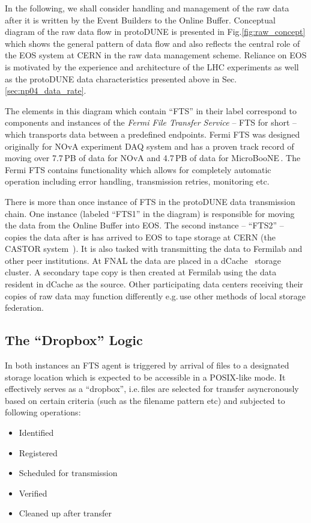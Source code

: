 \documentclass[a4paper]{jpconf}
\newcommand{\pd}{protoDUNE\xspace}
\begin{document}
In the following, we shall consider handling and management of the raw data after it is
written by the Event Builders to the Online Buffer.  Conceptual diagram of the raw data
flow in \pd is presented in Fig.\ref{fig:raw_concept} which shows the general pattern of data flow
and also reflects the central role of the EOS system at CERN \cite{eos} in the raw data management scheme.
Reliance on EOS is motivated by the experience and architecture of the LHC experiments
as well as the \pd data characteristics presented above in Sec.\,\ref{sec:np04_data_rate}.

The elements in this diagram which contain ``FTS'' in their label correspond to components and
instances of the \textit{Fermi File Transfer Service} -- FTS for short \cite{fts} -- which transports
data between a predefined endpoints. Fermi FTS was designed originally for NOvA experiment
\cite{nova} DAQ system and has a proven track record of moving over 7.7\,PB of data for NOvA
and 4.7\,PB of data for MicroBooNE\,\cite{uboone}.
The Fermi FTS contains functionality which allows for completely automatic operation
including error handling, transmission retries, monitoring etc.

There is more than once instance of FTS in the \pd data transmission chain. One instance (labeled ``FTS1''
in the diagram) is responsible for moving the data from the Online Buffer into EOS. The second instance
-- ``FTS2'' --  copies the data after is has arrived to EOS to tape storage at CERN (the CASTOR
system~\cite{castor}). It is also tasked with transmitting the data to Fermilab  and other peer
institutions. At FNAL the data are placed in a dCache~\cite{dcache} storage cluster. A secondary
tape copy is then created at Fermilab using the data resident in dCache as the source.
Other participating data centers receiving their copies of raw data may function differently
e.g.\,use other methods of local storage federation.

\subsection{The ``Dropbox'' Logic}
In both instances an FTS agent is triggered by arrival of files to a designated
storage location which is expected to be accessible in a POSIX-like  mode.
It effectively serves as a ``dropbox'', i.e.\,files are selected
for transfer asyncronously based on certain criteria (such as the filename pattern etc)
and subjected to following operations:
\begin{itemize}
\item Identified
\item Registered
\item Scheduled for transmission
\item Verified
\item Cleaned up after transfer
\end{itemize}
\end{document}
